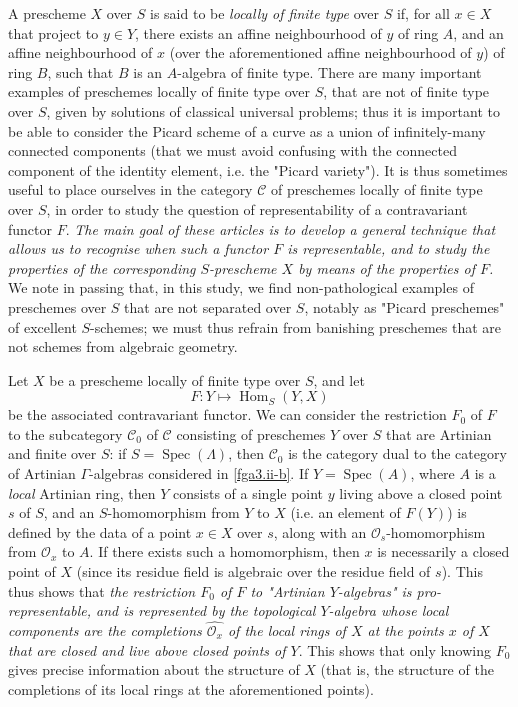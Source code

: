   A prescheme \(X\) over \(S\) is said to be \emph{locally of finite type} over \(S\) if, for all \(x\in  X\) that project to \(y\in  Y\), there exists an affine neighbourhood of \(y\) of ring \(A\), and an affine neighbourhood of \(x\) (over the aforementioned affine neighbourhood of \(y\)) of ring \(B\), such that \(B\) is an \(A\)-algebra of finite type.
  There are many important examples of preschemes locally of finite type over \(S\), that are not of finite type over \(S\), given by solutions of classical universal problems;
  thus it is important to be able to consider the Picard scheme of a curve as a union of infinitely-many connected components (that we must avoid confusing with the connected component of the identity element, i.e. the "Picard variety").
  It is thus sometimes useful to place ourselves in the category \(\mathcal {C}\) of preschemes locally of finite type over \(S\), in order to study the question of representability of a contravariant functor \(F\).
  \emph{The main goal of these articles is to develop a general technique that allows us to recognise when such a functor \(F\) is representable, and to study the properties of the corresponding \(S\)-prescheme \(X\) by means of the properties of \(F\).}
  We note in passing that, in this study, we find non-pathological examples of preschemes over \(S\) that are not separated over \(S\), notably as "Picard preschemes" of excellent \(S\)-schemes;
  we must thus refrain from banishing preschemes that are not schemes from algebraic geometry.\par{}Let \(X\) be a prescheme locally of finite type over \(S\), and let
  \[     F\colon  Y \mapsto  \operatorname {Hom}_S(Y,X)   \]
  be the associated contravariant functor.
  We can consider the restriction \(F_0\) of \(F\) to the subcategory \(\mathcal {C}_0\) of \(\mathcal {C}\) consisting of preschemes \(Y\) over \(S\) that are Artinian and finite over \(S\):
  if \(S=\operatorname {Spec}(\Lambda )\), then \(\mathcal {C}_0\) is the category dual to the category of Artinian \(\Gamma \)-algebras considered in \cref{fga3.ii-b}.
  If \(Y=\operatorname {Spec}(A)\), where \(A\) is a \emph{local} Artinian ring, then \(Y\) consists of a single point \(y\) living above a closed point \(s\) of \(S\), and an \(S\)-homomorphism from \(Y\) to \(X\) (i.e. an element of \(F(Y)\)) is defined by the data of a point \(x\in  X\) over \(s\), along with an \(\mathscr {O}_s\)-homomorphism from \(\mathscr {O}_x\) to \(A\).
  If there exists such a homomorphism, then \(x\) is necessarily a closed point of \(X\) (since its residue field is algebraic over the residue field of \(s\)).
  This thus shows that \emph{the restriction \(F_0\) of \(F\) to "Artinian \(Y\)-algebras" is pro-representable, and is represented by the topological \(Y\)-algebra whose local components are the completions \(\widehat {\mathscr {O}_x}\) of the local rings of \(X\) at the points \(x\) of \(X\) that are closed and live above closed points of \(Y\)}.
  This shows that only knowing \(F_0\) gives precise information about the structure of \(X\) (that is, the structure of the completions of its local rings at the aforementioned points).
  
